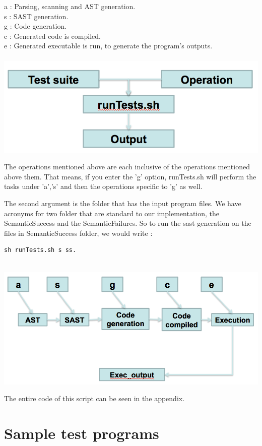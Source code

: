 a : Parsing, scanning and AST generation. \\
s : SAST generation.\\
g : Code generation.\\
c : Generated code is compiled.\\
e : Generated executable is run, to generate the program's outputs.\\ 
\\
\includegraphics[scale=0.60]{Test_diagrams/2.png}

The operations mentioned above are each inclusive of the operations mentioned above them. That means, if you enter the 'g' option, runTests.sh will perform the tasks under 'a','s' and then the operations specific to 'g' as well.

The second argument is the folder that has the input program files. We have acronyms for two folder that are standard to our implementation, the SemanticSuccess and the SemanticFailures. So to run the sast generation on the files in SemanticSuccess folder, we would write :
\\
\begin{lstlisting}
sh runTests.sh s ss.
\end{lstlisting}
\\
\includegraphics[scale=0.60]{Test_diagrams/1.png}


The entire code of this script can be seen in the appendix.


\section{Sample test programs}


